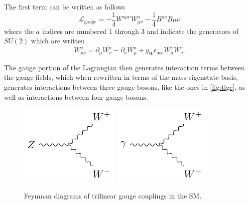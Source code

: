 The first term can be written as follows
%
\begin{equation}
\mathcal{L}_\text{gauge} = -\frac{1}{4}W^{a\mu\nu}W^a_{\mu\nu} - \frac{1}{4}B^{\mu\nu}B{\mu\nu} 
\end{equation}
%
where the $a$ indices are numbered 1 through 3 and indicate the generators of $SU(2)$ which are written 
%
\begin{equation}
W^a_{\mu\nu} = \partial_\mu W^a_\nu - \partial_\nu W^a_\mu + g_W \epsilon_{abc} W^b_\mu W^c_\nu .
\end{equation}

The gauge portion of the Lagrangian then generates interaction terms between the gauge fields, which when rewritten in terms of the mass-eigenstate basis, generates interactions between three gauge bosons, like the ones in \autoref{fig:tlgc}, as well as interactions between four gauge bosons.

\begin{centering}
\begin{figure}[!hbt]
\myfloatalign
\includegraphics[width=.45\linewidth]{feynman/tlgc_z.pdf}
\includegraphics[width=.45\linewidth]{feynman/tlgc_g.pdf}
\caption{Feynman diagrams of trilinear gauge couplings in the \ac{SM}.}
\label{fig:tlgc}
\end{figure}
\end{centering}

